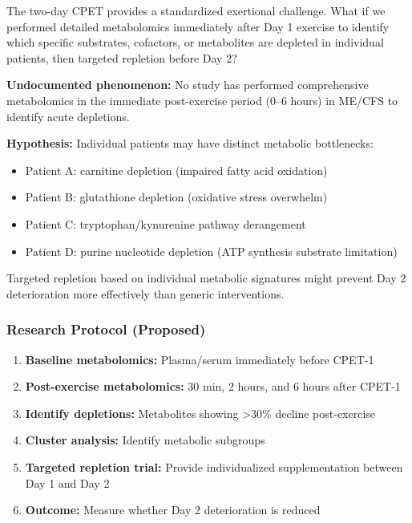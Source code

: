 \begin{open_question}
The two-day CPET provides a standardized exertional challenge. What if we performed detailed metabolomics immediately after Day 1 exercise to identify which specific substrates, cofactors, or metabolites are depleted in individual patients, then targeted repletion before Day 2?

\textbf{Undocumented phenomenon:} No study has performed comprehensive metabolomics in the immediate post-exercise period (0--6 hours) in ME/CFS to identify acute depletions.

\textbf{Hypothesis:} Individual patients may have distinct metabolic bottlenecks:
\begin{itemize}
    \item Patient A: carnitine depletion (impaired fatty acid oxidation)
    \item Patient B: glutathione depletion (oxidative stress overwhelm)
    \item Patient C: tryptophan/kynurenine pathway derangement
    \item Patient D: purine nucleotide depletion (ATP synthesis substrate limitation)
\end{itemize}

Targeted repletion based on individual metabolic signatures might prevent Day 2 deterioration more effectively than generic interventions.
\end{open_question}

\subsubsection{Research Protocol (Proposed)}

\begin{enumerate}
    \item \textbf{Baseline metabolomics:} Plasma/serum immediately before CPET-1
    \item \textbf{Post-exercise metabolomics:} 30 min, 2 hours, and 6 hours after CPET-1
    \item \textbf{Identify depletions:} Metabolites showing >30\% decline post-exercise
    \item \textbf{Cluster analysis:} Identify metabolic subgroups
    \item \textbf{Targeted repletion trial:} Provide individualized supplementation between Day 1 and Day 2
    \item \textbf{Outcome:} Measure whether Day 2 deterioration is reduced
\end{enumerate}

